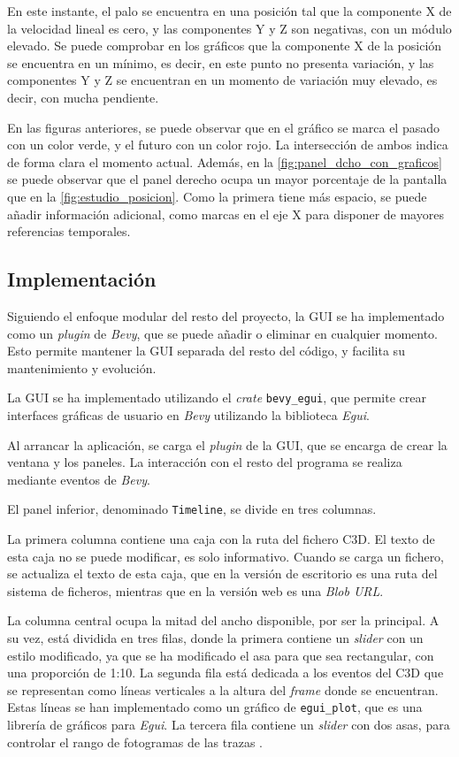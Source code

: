 En este instante, el palo se encuentra en una posición tal que la componente X de la velocidad lineal es cero, y las componentes Y y Z son negativas, con un módulo elevado. Se puede comprobar en los gráficos que la componente X de la posición se encuentra en un mínimo, es decir, en este punto no presenta variación, y las componentes Y y Z se encuentran en un momento de variación muy elevado, es decir, con mucha pendiente.

En las figuras anteriores, se puede observar que en el gráfico se marca el pasado con un color verde, y el futuro con un color rojo. La intersección de ambos indica de forma clara el momento actual. Además, en la \autoref{fig:panel_dcho_con_graficos} se puede observar que el panel derecho ocupa un mayor porcentaje de la pantalla que en la \autoref{fig:estudio_posicion}. Como la primera tiene más espacio, se puede añadir información adicional, como marcas en el eje X para disponer de mayores referencias temporales. 

\subsection{Implementación} \label{sec:implementacion-gui}

Siguiendo el enfoque modular del resto del proyecto, la \ac{GUI} se ha implementado como un \textit{plugin} de \textit{Bevy}, que se puede añadir o eliminar en cualquier momento. Esto permite mantener la \ac{GUI} separada del resto del código, y facilita su mantenimiento y evolución.

La \ac{GUI} se ha implementado utilizando el \textit{crate} \texttt{bevy\_egui}, que permite crear interfaces gráficas de usuario en \textit{Bevy} utilizando la biblioteca \textit{Egui}.  

Al arrancar la aplicación, se carga el \textit{plugin} de la \ac{GUI}, que se encarga de crear la ventana y los paneles. La interacción con el resto del programa se realiza mediante eventos de \textit{Bevy}. 

El panel inferior, denominado \texttt{Timeline}, se divide en tres columnas. 

La primera columna contiene una caja con la ruta del fichero \ac{C3D}. El texto de esta caja no se puede modificar, es solo informativo. Cuando se carga un fichero, se actualiza el texto de esta caja, que en la versión de escritorio es una ruta del sistema de ficheros, mientras que en la versión web es una \textit{Blob URL}. 

La columna central ocupa la mitad del ancho disponible, por ser la principal. A su vez, está dividida en tres filas, donde la primera contiene un \textit{slider} con un estilo modificado, ya que se ha modificado el asa para que sea rectangular, con una proporción de 1:10. La segunda fila está dedicada a los eventos del \ac{C3D} que se representan como líneas verticales a la altura del \textit{frame} donde se encuentran. Estas líneas se han implementado como un gráfico de \texttt{egui\_plot}, que es una librería de gráficos para \textit{Egui}. La tercera fila contiene un \textit{slider} con dos asas, para controlar el rango de fotogramas de las trazas \autocite{hacknusHacknusEgui_double_slider2025}.

